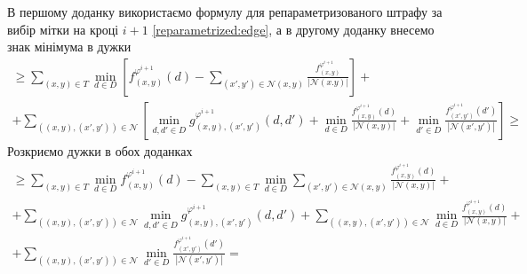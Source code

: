 В першому доданку використаємо формулу для репараметризованого штрафу за вибір
мітки на кроці $i + 1$ \eqref{reparametrized:edge},
а в другому доданку внесемо знак мінімума в дужки
\begin{equation*}
\begin{gathered}
    \ge \sum \limits_{\left(x, y \right) \in T}
        \min \limits_{d \in D} \left[
            f_{\left(x, y \right)}^{\varphi^{i + 1}} \left( d \right) -
            \sum \limits_{\left(x', y' \right) \in \mathcal{N}\left(x, y \right)}
                \frac{f_{\left(x, y \right)}^{\varphi^{i + 1}}}{\left| \mathcal{N}\left(x. y \right) \right|}
        \right] + \\
    + \sum \limits_{\left(\left(x, y \right), \left(x', y' \right)\right)\in \mathcal{N}}
    \left[
        \min\limits_{d, d' \in D}
            g_{\left(x, y \right),\left(x', y'\right)}^{\varphi^{i + 1}}
                \left(d, d' \right) +
        \min \limits_{d \in D}
            \frac{f_{\left(x, y \right)}^{\varphi^{i + 1}} \left( d \right)}{\left| \mathcal{N}\left(x, y\right)\right|} +
        \min \limits_{d' \in D}
            \frac{f_{\left(x', y' \right)}^{\varphi^{i + 1}} \left( d' \right)}{\left| \mathcal{N}\left(x', y'\right)\right|}
    \right] \ge
\end{gathered}
\end{equation*}
Розкриємо дужки в обох доданках
\begin{equation*}
\begin{gathered}
    \ge \sum \limits_{\left(x, y \right) \in T}
        \min \limits_{d \in D}
            f_{\left(x, y \right)}^{\varphi^{i + 1}}\left( d \right) -
    \sum \limits_{\left(x, y \right) \in T}
        \min \limits_{d \in D}
            \sum \limits_{\left(x', y' \right) \in \mathcal{N} \left(x, y \right)}
                \frac{f_{\left(x, y \right)}^{\varphi^{i + 1}} \left( d \right)}{\left| \mathcal{N}\left(x, y \right) \right|} + \\
    + \sum \limits_{\left(\left(x, y \right), \left(x', y' \right) \right)\in\mathcal{N}}
        \min \limits_{d, d' \in D}
            g_{\left(x, y \right), \left(x', y' \right)}^{\varphi^{i + 1}}
                \left(d, d' \right) +
    \sum \limits_{\left(\left(x, y \right), \left(x', y' \right) \right)\in\mathcal{N}}
        \min \limits_{d \in D}
            \frac{f_{\left(x, y \right)}^{\varphi^{i + 1}} \left( d \right)}{\left| \mathcal{N}\left(x, y\right)\right|} + \\
    + \sum \limits_{\left(\left(x, y \right), \left(x', y' \right) \right)\in\mathcal{N}}
    \min \limits_{d' \in D}
        \frac{f_{\left(x', y' \right)}^{\varphi^{i + 1}} \left( d' \right)}{\left| \mathcal{N}\left(x', y'\right)\right|} =
\end{gathered}
\end{equation*}
